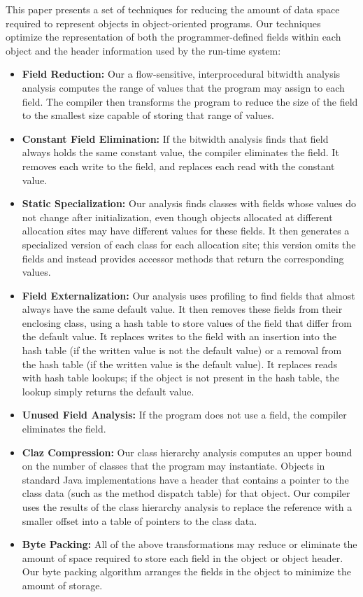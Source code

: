 \documentclass[preprint]{acmconf}
\begin{document}
This paper presents a set of techniques for reducing the
amount of data space required to represent objects
in object-oriented programs. Our techniques optimize
the representation of both the programmer-defined fields
within each object and the header information used by the
run-time system:
\begin{itemize}
\item {\bf Field Reduction:} 
Our a flow-sensitive, interprocedural bitwidth analysis
analysis computes the range of values that the program
may assign to each field. The compiler then transforms the program
to reduce the size of the field to the smallest size 
capable of storing that range of values. 
\item {\bf Constant Field Elimination:} 
If the bitwidth analysis finds that field always holds
the same constant value, the compiler eliminates the field. 
It removes each write to the field, and replaces each read
with the constant value.
\item {\bf Static Specialization:} Our analysis finds 
classes with fields whose values do not change after initialization,
even though objects allocated at different allocation sites may
have different values for these fields. It then generates 
a specialized version of each class for each allocation site;
this version omits the fields and instead provides accessor
methods that return the corresponding values. 
\item {\bf Field Externalization:} Our analysis uses profiling
to find fields that almost always have the same default value. 
It then removes these fields from their enclosing class, 
using a hash table to store values of the field that differ
from the default value. It replaces writes to the field with
an insertion into the hash table (if the written value is not the
default value) or a removal from the hash table (if the written value
is the default value). It replaces reads with hash table lookups; 
if the object is not present in the hash table, the lookup simply
returns the default value. 
\item {\bf Unused Field Analysis:} If the program does not
use a field, the compiler eliminates the field. 
\item {\bf Claz Compression:} Our class hierarchy analysis
computes an upper bound on the number of classes that the
program may instantiate. Objects in standard 
Java implementations have a header that contains a pointer
to the class data (such as the method dispatch table) for that object. 
Our compiler uses the results of the class
hierarchy analysis to replace the reference with a smaller
offset into a table of pointers to the class data. 
\item {\bf Byte Packing:} All of the above transformations may
reduce or eliminate the amount of space required to store each
field in the object or object header. Our byte packing algorithm
arranges the fields in the object to minimize the amount of 
storage. 
\end{itemize}
\end{document}
